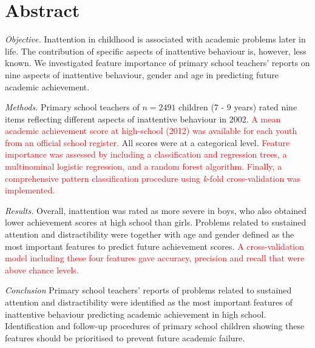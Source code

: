 \documentclass[10pt,letterpaper]{article}
\begin{document}
\section*{Abstract}
\noindent \emph{Objective.}
Inattention in childhood is associated with academic problems later in life. The contribution of specific aspects of inattentive behaviour is, however, less known. We investigated feature importance of primary school teachers' reports on nine aspects of inattentive behaviour, gender and age in predicting future academic achievement. 

\noindent \emph{Methods.} Primary school teachers of $n=2491$ children (7 - 9 years) rated nine items reflecting different aspects of inattentive behaviour in 2002. \textcolor{red}{A mean academic achievement score at high-school (2012) was available for each youth from an official school register.} All scores were at a categorical level. \textcolor{red}{Feature importance was assessed by including a classification and regression trees, a multinominal logistic regression, and a random forest algorithm. Finally, a comprehensive pattern classification procedure using {\em k}-fold cross-validation was implemented.}

\noindent \emph{Results.}
Overall, inattention was rated as more severe in boys, who also obtained lower achievement scores at high school than girls. Problems related to sustained attention and distractibility were together with age and gender defined as the most important features to predict future achievement scores. \textcolor{red}{A cross-validation model including these four features gave accuracy, precision and recall that were above chance levels. }

\noindent \emph{Conclusion} 
Primary school teachers' reports of problems related to sustained attention and distractibility were identified as the most important features of inattentive behaviour predicting academic achievement in high school.  Identification and follow-up procedures of primary school children showing these features should be prioritised to prevent future academic failure. %


\end{document}

